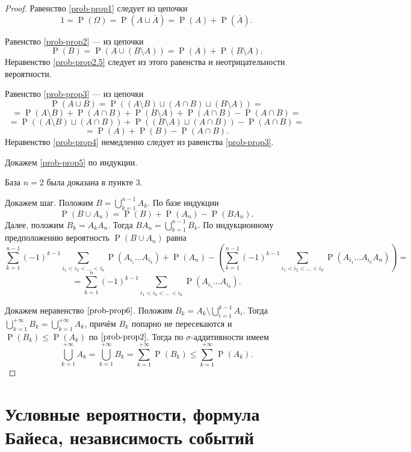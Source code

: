 \documentclass[12pt]{article}
\numberwithin{theorem}{section}
\numberwithin{proposition}{section}
\theoremstyle{definition}
\newcommand{\prob}{\operatorname{P}}
\begin{document}
	\begin{proof}
		Равенство \ref{prob-prop1} следует из цепочки 
		$$ 1 = \prob(\Omega) = \prob(A \sqcup \overline{A}) = \prob(A) + \prob(\overline{A}). $$
		
		Равенство \ref{prob-prop2} --- из цепочки 
		$$ \prob(B) = \prob(A \cup (B \setminus A)) = \prob(A) + \prob(B \setminus A). $$
		Неравенство \ref{prob-prop2.5} следует из этого равенства и неотрицательности вероятности.
		
		Равенство \ref{prob-prop3} --- из цепочки
		$$ \prob(A \cup B) = \prob((A \setminus B) \sqcup (A \cap B) \sqcup (B \setminus A)) = $$ 
		$$ = \prob(A \setminus B) + \prob(A \cap B) + \prob(B \setminus A) + \prob(A \cap B) - \prob(A \cap B) = $$
		$$ = \prob((A \setminus B) \sqcup (A \cap B)) + \prob((B \setminus A) \sqcup (A \cap B)) - \prob(A \cap B) = $$
		$$ = \prob(A) + \prob(B) - \prob (A \cap B). $$
		Неравенство \ref{prob-prop4} немедленно следует из равенства \ref{prob-prop3}.
		
		Докажем \ref{prob-prop5} по индукции.
		
		База $ n = 2 $ была доказана в пункте 3.
		
		Докажем шаг.
		Положим $ B = \bigcup\limits_{k = 1}^{n - 1} A_k $.
		По базе индукции $$ \prob(B \cup A_{n}) = \prob(B) + \prob(A_n) - \prob(B A_n). $$
		Далее, положим $ B_k = A_kA_n $. Тогда $ BA_n = \bigcup\limits_{k = 1}^{n - 1} B_k $.
		По индукционному предположению вероятность $ \prob(B \cup A_n) $ равна
		$$ \sum\limits_{k = 1}^{n - 1} 
		(-1)^{k - 1}\sum\limits_{i_1 < i_2 < \ldots < i_k} \prob(A_{i_1} \ldots A_{i_k})
		+ \prob(A_n)
		- \left(\sum\limits_{k = 1}^{n - 1} 
		(-1)^{k - 1}\sum\limits_{i_1 < i_2 < \ldots < i_k} \prob(A_{i_1} \ldots A_{i_k} A_{n})\right) = $$
		$$ = \sum\limits_{k = 1}^{n} 
		(-1)^{k - 1}\sum\limits_{i_1 < i_2 < \ldots < i_k} \prob(A_{i_1} \ldots A_{i_k}). $$
		
		Докажем неравенство $ \ref{prob-prop6} $.
		Положим $ B_k = A_k \setminus \bigcup\limits_{i = 1}^{k - 1} A_i $.
		Тогда $ \bigcup\limits_{k = 1}^{+\infty} B_k = \bigcup\limits_{k = 1}^{+\infty} A_k $,
		причём  $ B_k $ попарно не пересекаются и $ \prob(B_k) \leqslant \prob(A_k) $ по $ \ref{prob-prop2} $.
		Тогда по $ \sigma $-аддитивности имеем 
		$$ \bigcup\limits_{k = 1}^{+\infty} A_k = \bigcup\limits_{k = 1}^{+\infty} B_k 
		= \sum\limits_{k = 1}^{+\infty} \prob(B_k) \leqslant \sum\limits_{k = 1}^{+\infty} \prob(A_k). $$
	\end{proof}
	
	\section{Условные вероятности, формула Байеса, независимость событий}
	
\end{document}
